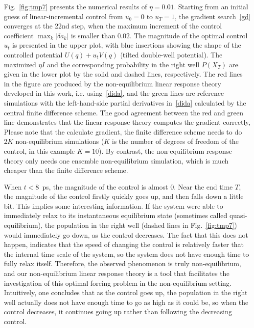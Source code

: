 \documentclass[]{tMPH2e}
\begin{document}
Fig.~\ref{fig:tmp7} presents the numerical results of $\eta = 0.01$.
Starting from an initial guess of linear-incremental control from $u_0 = 0$ to
$u_T = 1$,
the gradient search~\eqref{gd} converges at the 22nd step, when the
maximum increment of the control coefficient $\max_k\vert \delta a_k\vert$
is smaller than $0.02$.
The magnitude of the optimal
control $u_t$ is presented in the upper plot,
with blue insertions showing the shape of the controlled potential 
$U(q) + u_tV(q)$ (tilted double-well potential). 
The maximized $\eta I$ and the corresponding probability in the right well
$P( X_T)$ are
given in the lower plot by the solid and dashed lines, respectively.
The red lines in the figure are produced by the non-equilibrium
linear response theory developed in this work, i.e. using~\eqref{dida},
and the green lines are reference simulations with the left-hand-side
partial derivatives in~\eqref{dida} calculated by the central
finite difference scheme.
The good agreement between the red and green line demonstrates that 
the linear response theory computes the gradient correctly,
Please note that the calculate gradient, the finite difference scheme
needs to do $2K$ non-equilibrium simulations
($K$ is the number of degrees of freedom of the control,
in this example $K = 10$). By contrast, the non-equilibrium response theory
only needs one ensemble non-equilibrium simulation, which is much cheaper than
the finite difference scheme.

When $t<8$~ps, the magnitude of the control is
almost 0.  Near the end time $T$, the magnitude of the control firstly
quickly goes up, and then falls down a little bit.  This implies some
interesting information.  If the system were able to immediately relax
to its instantaneous equilibrium state (sometimes called
quasi-equilibrium), the population in the right well (dashed lines in
Fig.~\ref{fig:tmp7}) would immediately go down, as the control
decreases.  The fact that this does not happen, indicates that the
speed of changing the control is relatively faster that the internal
time scale of the system, so the system does not have enough time to
fully relax itself. Therefore, the observed phenomenon is truly
non-equilibrium, and our non-equilibrium linear response theory is a
tool that facilitates the investigation of this optimal forcing
problem in the non-equilibrium setting.  Intuitively, one concludes
that as the control goes up, the population in the right well actually
does not have enough time to go as high as it could be, so when the
control decreases, it continues going up rather than following the
decreasing control.
\end{document}
